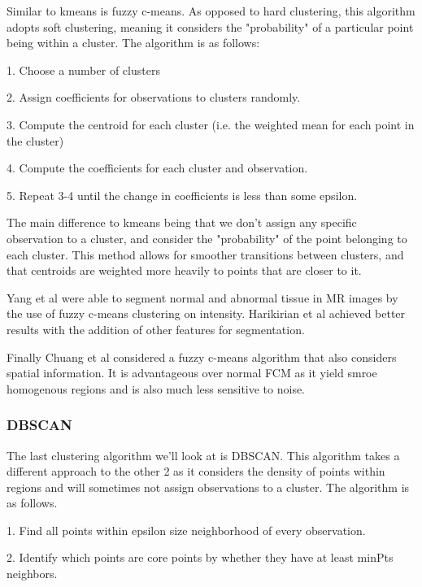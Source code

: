 \documentclass[a4]{article}
\begin{document}
Similar to kmeans is fuzzy c-means. As opposed to hard clustering, this algorithm adopts soft clustering, meaning it considers the "probability" of a particular point being within a cluster. The algorithm is as follows: 

  

1. Choose a number of clusters 

2. Assign coefficients for observations to clusters randomly. 

3. Compute the centroid for each cluster (i.e. the weighted mean for each point in the cluster) 

4. Compute the coefficients for each cluster and observation. 

5. Repeat 3-4 until the change in coefficients is less than some epsilon. 

  

The main difference to kmeans being that we don't assign any specific observation to a cluster, and consider the "probability" of the point belonging to each cluster. This method allows for smoother transitions between clusters, and that centroids are weighted more heavily to points that are closer to it. 

  

Yang et al \cite{yang2002segmentation} were able to segment normal and abnormal tissue in MR images by the use of fuzzy c-means clustering on intensity. Harikirian et al \cite{harikiran2015multiple} achieved better results with the addition of other features for segmentation. 

  

Finally Chuang et al \cite{chuang2006fuzzy} considered a fuzzy c-means algorithm that also considers spatial information. It is advantageous over normal FCM as it yield smroe homogenous regions and is also much less sensitive to noise. 

 

\subsubsection*{DBSCAN}

The last clustering algorithm we'll look at is DBSCAN. This algorithm takes a different approach to the other 2 as it considers the density of points within regions and will sometimes not assign observations to a cluster. The algorithm is as follows. 


1. Find all points within epsilon size neighborhood of every observation. 

2. Identify which points are core points by whether they have at least minPts neighbors. 
\end{document}
